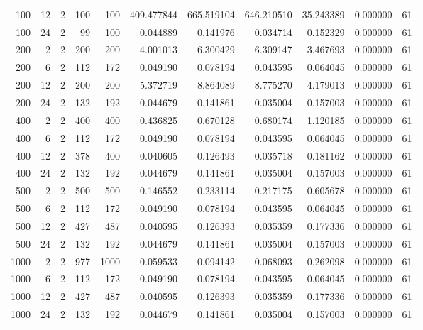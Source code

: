 \begin{table}
\begin{tabular}{rrrrrrrrrrr}
100 & 12 & 2 & 100 & 100 & 409.477844 & 665.519104 & 646.210510 & 35.243389 & 0.000000 & 61 \\
100 & 24 & 2 & 99 & 100 & 0.044889 & 0.141976 & 0.034714 & 0.152329 & 0.000000 & 61 \\
200 & 2 & 2 & 200 & 200 & 4.001013 & 6.300429 & 6.309147 & 3.467693 & 0.000000 & 61 \\
200 & 6 & 2 & 112 & 172 & 0.049190 & 0.078194 & 0.043595 & 0.064045 & 0.000000 & 61 \\
200 & 12 & 2 & 200 & 200 & 5.372719 & 8.864089 & 8.775270 & 4.179013 & 0.000000 & 61 \\
200 & 24 & 2 & 132 & 192 & 0.044679 & 0.141861 & 0.035004 & 0.157003 & 0.000000 & 61 \\
400 & 2 & 2 & 400 & 400 & 0.436825 & 0.670128 & 0.680174 & 1.120185 & 0.000000 & 61 \\
400 & 6 & 2 & 112 & 172 & 0.049190 & 0.078194 & 0.043595 & 0.064045 & 0.000000 & 61 \\
400 & 12 & 2 & 378 & 400 & 0.040605 & 0.126493 & 0.035718 & 0.181162 & 0.000000 & 61 \\
400 & 24 & 2 & 132 & 192 & 0.044679 & 0.141861 & 0.035004 & 0.157003 & 0.000000 & 61 \\
500 & 2 & 2 & 500 & 500 & 0.146552 & 0.233114 & 0.217175 & 0.605678 & 0.000000 & 61 \\
500 & 6 & 2 & 112 & 172 & 0.049190 & 0.078194 & 0.043595 & 0.064045 & 0.000000 & 61 \\
500 & 12 & 2 & 427 & 487 & 0.040595 & 0.126393 & 0.035359 & 0.177336 & 0.000000 & 61 \\
500 & 24 & 2 & 132 & 192 & 0.044679 & 0.141861 & 0.035004 & 0.157003 & 0.000000 & 61 \\
1000 & 2 & 2 & 977 & 1000 & 0.059533 & 0.094142 & 0.068093 & 0.262098 & 0.000000 & 61 \\
1000 & 6 & 2 & 112 & 172 & 0.049190 & 0.078194 & 0.043595 & 0.064045 & 0.000000 & 61 \\
1000 & 12 & 2 & 427 & 487 & 0.040595 & 0.126393 & 0.035359 & 0.177336 & 0.000000 & 61 \\
1000 & 24 & 2 & 132 & 192 & 0.044679 & 0.141861 & 0.035004 & 0.157003 & 0.000000 & 61 \\
\bottomrule
\end{tabular}
\end{table}
